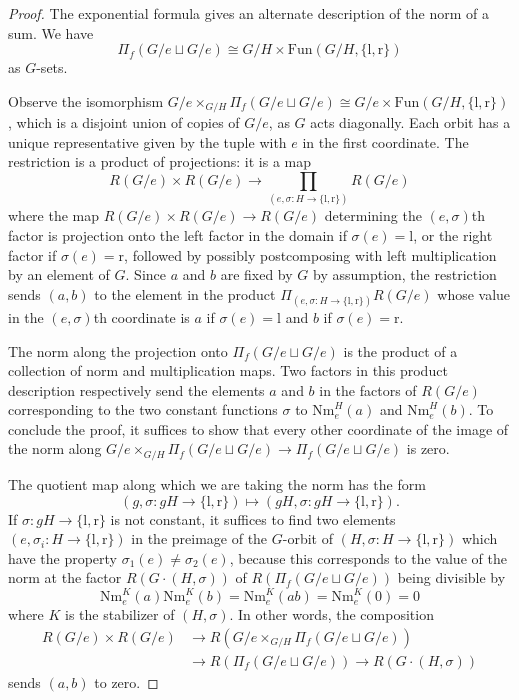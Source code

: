 \documentclass[11pt,dvipsnames]{amsart}
\theoremstyle{BoldRemark}
\begin{document}
\begin{proof}
	The exponential formula gives an alternate description of the norm of a sum. We have 
    \[ 
        \Pi_f (G/e \sqcup G/e) \cong G/H \times \mathrm{Fun}(G/H,\{ \mathrm{l} , \mathrm{r} \}) 
    \] 
    as $G$-sets.
	
	Observe the isomorphism $G/e \times_{G/H} \Pi_f (G/e \sqcup G/e) \cong G/e \times \mathrm{Fun}(G/H,\{ \mathrm{l} , \mathrm{r} \})$, which is a disjoint union of copies of $G/e$, as $G$ acts diagonally. Each orbit has a unique representative given by the tuple with $e$ in the first coordinate. The restriction is a product of projections: it is a map \[ R(G/e) \times R(G/e) \rightarrow \prod_{(e,\sigma : H \rightarrow \{ \mathrm{l} , \mathrm{r} \})} R(G/e) \] where the map $R(G/e) \times R(G/e) \rightarrow R(G/e)$ determining the $(e,\sigma)$th factor is projection onto the left factor in the domain if $\sigma(e) = \mathrm{l}$, or the right factor if $\sigma(e) = \mathrm{r}$, followed by possibly postcomposing with left multiplication by an element of $G$. Since $a$ and $b$ are fixed by $G$ by assumption, the restriction sends $(a,b)$ to the element in the product $\Pi_{(e,\sigma : H \rightarrow \{ \mathrm{l} , \mathrm{r} \})} R(G/e)$ whose value in the $(e,\sigma)$th coordinate is $a$ if $\sigma(e) = \mathrm{l}$ and $b$ if $\sigma(e) = \mathrm{r}$.
	
	The norm along the projection onto $\Pi_f (G/e \sqcup G/e)$ is the product of a collection of norm and multiplication maps. Two factors in this product description respectively send the elements $a$ and $b$ in the factors of $R(G/e)$ corresponding to the two constant functions $\sigma$ to $\mathrm{Nm}_e^H(a)$ and $\mathrm{Nm}_e^H(b)$. To conclude the proof, it suffices to show that every other coordinate of the image of the norm along $G/e \times_{G/H} \Pi_f ( G/e \sqcup G/e) \rightarrow \Pi_f (G/e \sqcup G/e)$ is zero.
	
	The quotient map along which we are taking the norm has the form \[ (g, \sigma : gH \rightarrow \{ \mathrm{l} , \mathrm{r} \}) \mapsto (gH, \sigma : gH \rightarrow \{ \mathrm{l} , \mathrm{r} \}) . \] If $\sigma : gH \rightarrow \{ \mathrm{l} , \mathrm{r} \}$ is not constant, it suffices to find two elements $(e, \sigma_i : H \rightarrow \{ \mathrm{l} , \mathrm{r} \})$ in the preimage of the $G$-orbit of $(H, \sigma : H \rightarrow \{ \mathrm{l} , \mathrm{r} \})$ which have the property $\sigma_1(e) \neq \sigma_2(e)$, because this corresponds to the value of the norm at the factor $R(G \cdot (H,\sigma))$ of $R(\Pi_f (G/e \sqcup G/e))$ being divisible by \[ \mathrm{Nm}_e^K(a) \mathrm{Nm}_e^K(b) = \mathrm{Nm}_e^K(ab) = \mathrm{Nm}_e^K(0) = 0 \] where $K$ is the stabilizer of $(H,\sigma)$. In other words, the composition 
    \begin{align*}
        R(G/e) \times R(G/e) & \rightarrow R(G/e \times_{G/H} \Pi_f (G/e \sqcup G/e)) \\
        & \rightarrow R(\Pi_f (G/e \sqcup G/e)) \rightarrow R(G \cdot (H,\sigma))
    \end{align*} 
    sends $(a,b)$ to zero.
	

\end{proof}
\end{document}
